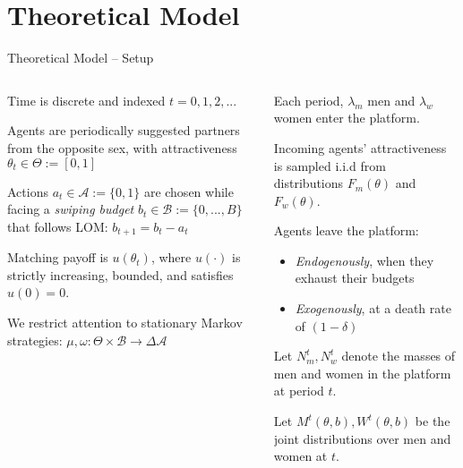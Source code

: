\documentclass[10pt, aspectratio=169,xcolor=dvipsnames]{beamer}
\makeatletter
\newenvironment{myitemize}{%
   \setlength{\topsep}{0pt}
   \setlength{\partopsep}{0pt}
   \itemize
}{\enditemize}
\makeatother
\begin{document}
\section{Theoretical Model}
\begin{frame}{Theoretical Model – Setup} 
\begin{columns}
\begin{column}{0.5\textwidth}
\begin{myitemize}
\setlength\itemsep{1em}
    \item Time is discrete and indexed $t=0,1,2,...$ %
    \item Agents are periodically suggested partners from the opposite sex, with attractiveness $\theta_{t} \in \Theta := [0,1]$
    \item Actions $a_t \in\mathcal{A} := \{0,1\}$ are chosen while facing a \textit{swiping budget} $b_t \in \mathcal{B}:=\{0,...,B\}$ that follows LOM: $b_{t+1}=b_t - a_t$
    \item Matching payoff is $u(\theta_{t})$, where $u(\cdot)$ is strictly increasing, bounded, and satisfies $u(0)=0$.
    \item We restrict attention to stationary Markov strategies: $\mu,\omega: \Theta \times \mathcal{B}\rightarrow \Delta \mathcal{A}$
\end{myitemize}
\end{column} 

\begin{column}{0.5\textwidth}
\begin{myitemize}
\setlength\itemsep{1em}
    \item Each period, $\lambda_m$ men and $\lambda_w$ women enter the platform.
    \item Incoming agents' attractiveness is sampled i.i.d from distributions $F_m(\theta)$ and $F_w(\theta)$. 
    \item Agents leave the platform:
    \begin{itemize}
        \item \textit{Endogenously}, when they exhaust their budgets
        \item \textit{Exogenously}, at a death rate of $(1-\delta)$
    \end{itemize}
    \item Let $N^t_m, N^t_w$ denote the masses of men and women in the platform at period $t$.
    \item Let $M^t(\theta,b), W^t(\theta,b)$ be the joint distributions over men and women at $t$.
\end{myitemize}
\end{column}
\end{columns}
\end{frame} 
\end{document}
